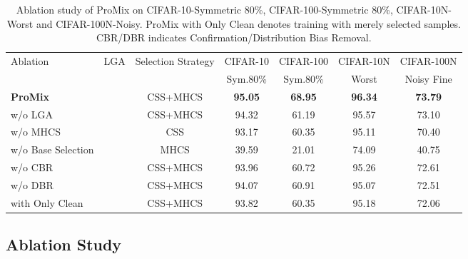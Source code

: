 \documentclass{article}
\newcommand{\xmark}{\ding{55}}\definecolor{lightgrey}{HTML}{dcdbdb}
\begin{document}
\begin{table*}[!ht]
    \centering
    \small
\tabcolsep=0.35cm
    \begin{tabular}{l|cc|cccc}
        \toprule
        \multirow{2}{*}{Ablation}  & \multirow{2}{*}{LGA}  & \multirow{2}{*}{Selection Strategy} &  CIFAR-10 & CIFAR-100  & CIFAR-10N & CIFAR-100N\\ 
        & & & Sym.80\% & Sym.80\% &Worst&Noisy Fine \\
        \midrule
        \textbf{ProMix}     & \checkmark	  & CSS+MHCS  & \textbf{95.05}  & \textbf{68.95} & \textbf{96.34}  & \textbf{73.79}\\
        w/o LGA & \xmark	  & CSS+MHCS  & 94.32  & 61.19  & 95.57  & 73.10\\ 
        w/o MHCS      & \xmark	  & CSS& 93.17	  & 60.35  & 95.11  & 70.40\\ 
        w/o Base Selection    & \xmark	  & MHCS& 39.59	  & 21.01  & 74.09  & 40.75\\ 
        \midrule
       
        w/o CBR   & \xmark	  & CSS+MHCS & 93.96	  & 60.72  & 95.26  & 72.61\\ 
        w/o DBR   & \xmark	  & CSS+MHCS  & 94.07	  & 60.91  & 95.07  & 72.51\\ \midrule
         with Only Clean   & \xmark	  & CSS+MHCS & 93.82	  & 60.35  & 95.18  & 72.06\\ 
        
        \bottomrule
    \end{tabular}
    \caption{ \small Ablation study of ProMix on CIFAR-10-Symmetric 80\%, CIFAR-100-Symmetric 80\%, CIFAR-10N-Worst and CIFAR-100N-Noisy. ProMix with Only Clean denotes training with merely selected samples. CBR/DBR indicates Confirmation/Distribution Bias Removal. 
    } 
    \label{tab:ablation}
\end{table*}

\subsection{Ablation Study}
\end{document}
